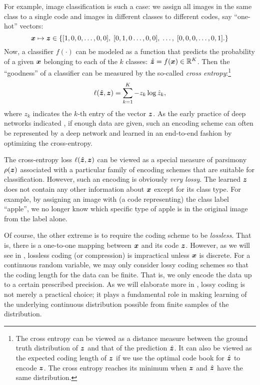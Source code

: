 \documentclass[../../book-main.tex]{subfiles}
\begin{document}
\begin{example}\label{example:image_classification_feature_learning}
    For example, image classification is such a case: we assign all images in the same class to a single code and images in different classes to different codes, say ``one-hot'' vectors:
    \begin{equation}
        \bm{x} \mapsto \bm{z} \in \{  [1, 0, 0, \ldots , 0, 0], \;  [0, 1, 0 \ldots, 0, 0], \; \ldots, \;  [0,0,0, \ldots, 0, 1].\}
        \label{eqn:class-labels}
    \end{equation}
    Now, a classifier $f(\cdot)$ can be modeled as a function that predicts the probability of a given $\bm{x}$ belonging to each of the $k$ classes: $\hat{\bm{z}} = f(\bm{x}) \in \mathbb{R}^K$. Then the ``goodness'' of a classifier can be measured by the so-called {\em cross entropy}:\footnote{The cross entropy can be viewed as a distance measure between the ground truth distribution of $\bm{z}$ and that of the prediction $\hat{\bm{z}}$. It can also be viewed as the expected coding length of $\bm{z}$ if we use the optimal code book for $\hat {\bm{z}}$ to encode $\bm{z}$. The cross entropy reaches its minimum when $\bm{z}$ and $\hat {\bm{z}}$ have the same distribution.}
    \begin{equation}
        \ell(\hat{\bm{z}}, \bm{z}) = \sum_{k=1}^K - z_k \log \hat{z}_k,
    \end{equation}
    where $z_k$ indicates the $k$-th entry of the vector $\bm{z}$. As the early practice of deep networks indicated \cite{krizhevsky2012imagenet}, if enough data are given, such an encoding scheme can often be represented by a deep network and learned in an end-to-end fashion by optimizing the cross-entropy. 
\end{example}

The cross-entropy loss $\ell(\hat {\bm{z}}, \bm{z})$ can be viewed as a special measure of parsimony $\rho(\bm{z})$ associated with a particular family of encoding schemes that are suitable for classification. However, such an encoding is obviously \textit{very lossy}. The learned $\bm{z}$ does not contain any other information about $\bm{x}$ except for its class type. For example, by assigning an image with (a code representing) the class label ``apple'', we no longer know which specific type of apple is in the original image from the label alone. 

Of course, the other extreme is to require the coding scheme to be \textit{lossless}. That is, there is a one-to-one mapping between $\bm{x}$ and its code $\bm{z}$. However, as we will see in , lossless coding (or compression) is impractical unless $\bm{x}$ is discrete. For a continuous random variable, we may only consider lossy coding schemes so that the coding length for the data can be finite. That is, we only encode the data up to a certain prescribed precision. As we will elaborate more in , lossy coding is not merely a practical choice; it plays a fundamental role in making learning of the underlying continuous distribution possible from finite samples of the distribution. 
\end{document}
